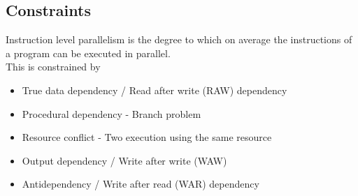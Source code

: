 \documentclass[12pt, a4paper]{article}
\begin{document}
		\subsection{Constraints}
			Instruction level parallelism is the degree to which on average the instructions of a program can be executed in parallel.\\
			This is constrained by
			\begin{itemize}
				\item True data dependency / Read after write (RAW) dependency
				\item Procedural dependency - Branch problem
				\item Resource conflict - Two execution using the same resource
				\item Output dependency / Write after write (WAW)
				\item Antidependency / Write after read (WAR) dependency
			\end{itemize}
\end{document}
